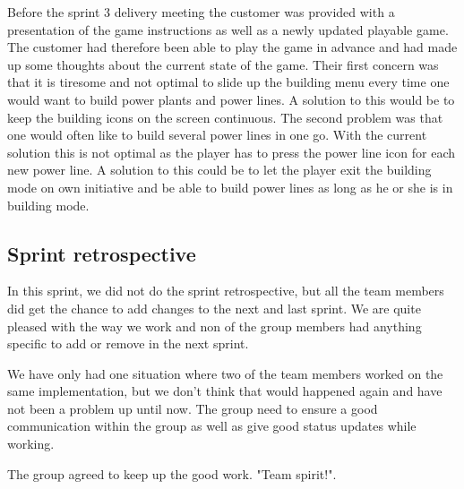 	Before the sprint 3 delivery meeting the customer was provided with a presentation of the game instructions as well as a newly updated playable game. The customer had therefore been able to play the game in advance and had made up some thoughts about the current state of the game. Their first concern was that it is tiresome and not optimal to slide up the building menu every time one would want to build power plants and power lines. A solution to this would be to keep the building icons on the screen continuous. The second problem was that one would often like to build several power lines in one go. With the current solution this is not optimal as the player has to press the power line icon for each new power line. A solution to this could be to let the player exit the building mode on own initiative and be able to build power lines as long as he or she is in building mode.

\subsection{Sprint retrospective}
	In this sprint, we did not do the sprint retrospective, but all the team members did
	get the chance to add changes to the next and last sprint. We are quite pleased with the way 
	we work and non of the group members had anything specific to add or remove in the next sprint.

	We have only had one situation where two of the team members worked on the same implementation, 
	but we don't think that would happened again and have not been a problem up until now. 
	The group need to ensure a good communication within the group as well as give good status
	updates while working. 

	The group agreed to keep up the good work. "Team spirit!".
